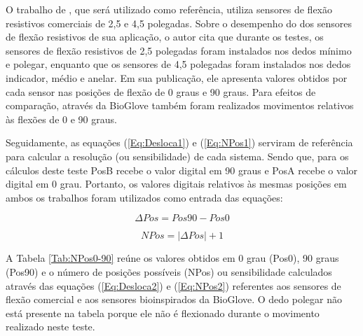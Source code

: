 \documentclass[
	12pt,				%
	openright,			%
	oneside,			%
	a4paper,			%
	english,			%
	brazil				%
	]{abntex2}
\begin{document}
	
		O trabalho de \cite{anbarasi2013deafmute}, que será utilizado como referência, utiliza sensores de flexão resistivos comerciais de 2,5 e 4,5 polegadas. Sobre o desempenho do dos sensores de flexão resistivos de sua aplicação, o autor cita que durante os testes, os sensores de flexão resistivos de 2,5 polegadas foram instalados nos dedos mínimo e polegar, enquanto que os sensores de 4,5 polegadas foram instalados nos dedos indicador, médio e anelar. Em sua publicação, ele apresenta valores obtidos por cada sensor nas posições de flexão de 0 graus e 90 graus. Para efeitos de comparação, através da BioGlove também foram realizados movimentos relativos às flexões de 0 e 90 graus. 
		
		Seguidamente, as equações (\ref{Eq:Desloca1}) e (\ref{Eq:NPos1}) serviram de referência para calcular a resolução (ou sensibilidade) de cada sistema. Sendo que, para os cálculos deste teste PosB recebe o valor digital em 90 graus e PosA recebe o valor digital em 0 grau. Portanto, os valores digitais relativos às mesmas posições em ambos os trabalhos foram utilizados como entrada das equações: 
		
	\begin{equation}
			\Delta Pos 	= Pos 90 	- 	Pos 0
		\label{Eq:Desloca2}
	\end{equation}


	\begin{equation}
			NPos = |\Delta Pos| + 1
		\label{Eq:NPos2}
	\end{equation}


		A Tabela \ref{Tab:NPos0-90} reúne os valores obtidos em 0 grau (Pos0), 90 graus (Pos90) e o número de posições possíveis (NPos) ou sensibilidade calculados através das equações (\ref{Eq:Desloca2}) e (\ref{Eq:NPos2}) referentes aos sensores de flexão comercial e aos sensores bioinspirados da BioGlove. O dedo polegar não está presente na tabela porque ele não é flexionado durante o movimento realizado neste teste.
		
\end{document}

